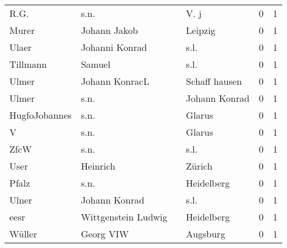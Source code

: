 \begin{center}
\begin{tiny}
\begin{longtabu}{llllrr}
                     R.G. &                               s.n. &             &                                        V. j &          0 &         1 \\
                    Murer &                       Johann Jakob &             &                                     Leipzig &          0 &         1 \\
                    Ulaer &                     Johanni Konrad &             &                                        s.l. &          0 &         1 \\
                 Tillmann &                             Samuel &             &                                        s.l. &          0 &         1 \\
                    Ulmer &                     Johann KonracL &             &                               Schaff hausen &          0 &         1 \\
                    Ulmer &                               s.n. &             &                               Johann Konrad &          0 &         1 \\
            HugfoJobannes &                               s.n. &             &                                      Glarus &          0 &         1 \\
                        V &                               s.n. &             &                                      Glarus &          0 &         1 \\
                     ZfcW &                               s.n. &             &                                        s.l. &          0 &         1 \\
                     User &                           Heinrich &             &                                      Zürich &          0 &         1 \\
                    Pfalz &                               s.n. &             &                                  Heidelberg &          0 &         1 \\
                    Ulner &                      Johann Konrad &             &                                        s.l. &          0 &         1 \\
                     eesr &                Wittgenstein Ludwig &             &                                  Heidelberg &          0 &         1 \\
                   Wüller &                          Georg VIW &             &                                    Augsburg &          0 &         1 \\

\end{longtabu}
\end{tiny}
\end{center}

